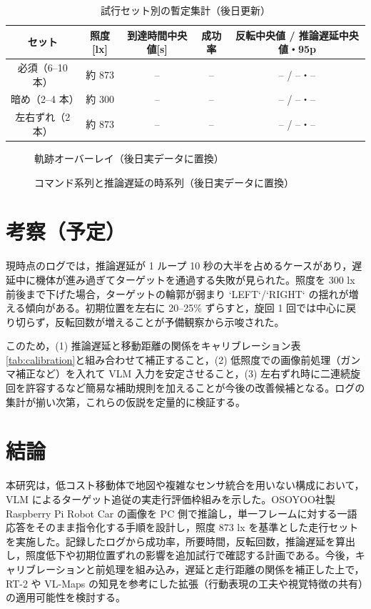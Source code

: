 \documentclass[a4paper,11pt]{ltjsreport}
\begin{document}
\begin{table}[htbp]
  \centering
  \caption{試行セット別の暫定集計（後日更新）}
  \label{tab:summary}
  \begin{tabular}{|c|c|c|c|c|}
    \hline
    セット & 照度[lx] & 到達時間中央値[s] & 成功率 & 反転中央値 / 推論遅延中央値・95p \\
    \hline
    必須（6--10 本） & 約 873 & -- & -- & -- / --・-- \\
    暗め（2--4 本） & 約 300 & -- & -- & -- / --・-- \\
    左右ずれ（2 本） & 約 873 & -- & -- & -- / --・-- \\
    \hline
  \end{tabular}
\end{table}

\begin{figure}[htbp]
  \centering
  \fbox{\rule{0.65\textwidth}{0.32\textwidth}}
  \caption{軌跡オーバーレイ（後日実データに置換）}
  \label{fig:trajectory1}
\end{figure}

\begin{figure}[htbp]
  \centering
  \fbox{\rule{0.65\textwidth}{0.32\textwidth}}
  \caption{コマンド系列と推論遅延の時系列（後日実データに置換）}
  \label{fig:trajectory2}
\end{figure}

\chapter{考察（予定）}
\label{chap:discussion}
現時点のログでは，推論遅延が 1 ループ 10 秒の大半を占めるケースがあり，遅延中に機体が進み過ぎてターゲットを通過する失敗が見られた。照度を 300 lx 前後まで下げた場合，ターゲットの輪郭が弱まり `LEFT`/`RIGHT` の揺れが増える傾向がある。初期位置を左右に 20--25\% ずらすと，旋回 1 回では中心に戻り切らず，反転回数が増えることが予備観察から示唆された。

このため，(1) 推論遅延と移動距離の関係をキャリブレーション表\ref{tab:calibration}と組み合わせて補正すること，(2) 低照度での画像前処理（ガンマ補正など）を入れて VLM 入力を安定させること，(3) 左右ずれ時に二連続旋回を許容するなど簡易な補助規則を加えることが今後の改善候補となる。ログの集計が揃い次第，これらの仮説を定量的に検証する。

\chapter{結論}
\label{chap:conclusion}
本研究は，低コスト移動体で地図や複雑なセンサ統合を用いない構成において，VLM によるターゲット追従の実走行評価枠組みを示した。OSOYOO社製 Raspberry Pi Robot Car の画像を PC 側で推論し，単一フレームに対する一語応答をそのまま指令化する手順を設計し，照度 873 lx を基準とした走行セットを実施した。記録したログから成功率，所要時間，反転回数，推論遅延を算出し，照度低下や初期位置ずれの影響を追加試行で確認する計画である。今後，キャリブレーションと前処理を組み込み，遅延と走行距離の関係を補正した上で，RT-2 や VL-Maps の知見を参考にした拡張（行動表現の工夫や視覚特徴の共有）の適用可能性を検討する。
\end{document}
